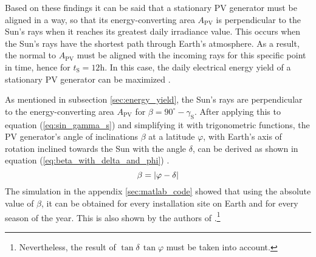 Based on these findings it can be said that a stationary PV generator must be aligned in a way, so that its energy-converting area $A_{\mathrm{PV}}$ is perpendicular to the Sun's rays when it reaches its greatest daily irradiance value. This occurs when the Sun's rays have the shortest path through Earth's atmosphere. As a result, the normal to $A_{\mathrm{PV}}$ must be aligned with the incoming rays for this specific point in time, hence for $t_{\mathrm{S}} = 12\mathrm{h}$. In this case, the daily electrical energy yield of a stationary PV generator can be maximized \cite{Landis:1995, Mertens:2015, Wagner:2018}.

As mentioned in subsection \ref{sec:energy_yield}, the Sun's rays are perpendicular to the energy-converting area $A_{\mathrm{PV}}$ for $\beta = 90^\circ - \gamma_{\mathrm{S}}$. After applying this to equation (\ref{eq:sin_gamma_s}) and simplifying it with trigonometric functions, the PV generator's angle of inclinations $\beta$ at a latitude $\varphi$, with Earth's axis of rotation inclined towards the Sun with the angle $\delta$, can be derived as shown in equation (\ref{eq:beta_with_delta_and_phi}) \cite{Landis:1995, Mertens:2015, Wagner:2018}.
	\begin{equation} \label{eq:beta_with_delta_and_phi}
	\centering
		\beta = \left|\varphi - \delta\right|
	\end{equation}
The \MATLAB simulation in the appendix \ref{sec:matlab_code} showed that using the absolute value of $\beta$, it can be obtained for every installation site on Earth and for every season of the year. This is also shown by the authors of \cite{Karafil:2016}.\footnote{Nevertheless, the result of $\tan \delta \, \tan \varphi$ must be taken into account.} %

